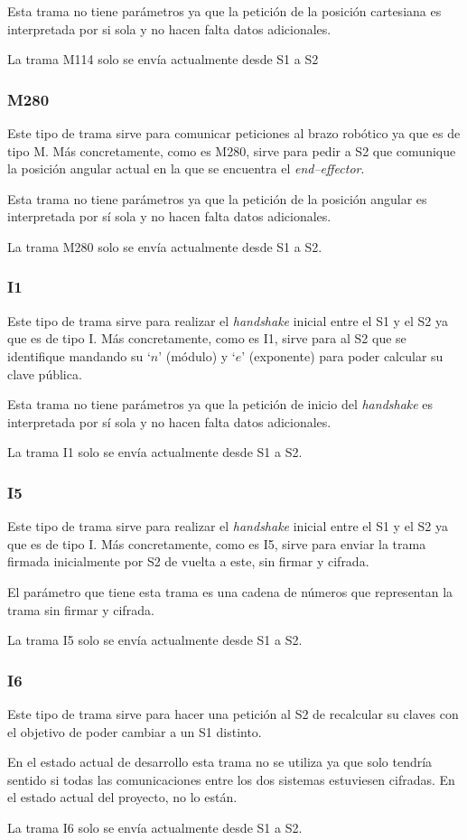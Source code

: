 Esta trama no tiene parámetros ya que la petición de la posición cartesiana es interpretada por si sola y no hacen falta datos adicionales.

La trama M114 solo se envía actualmente desde \ac{S1} a \ac{S2}

\subsubsection{M280}
Este tipo de trama sirve para comunicar peticiones al brazo robótico ya que es de tipo M. Más concretamente, como es M280, sirve para pedir a \ac{S2} que comunique la posición angular
actual en la que se encuentra el \textit{end--effector}.

Esta trama no tiene parámetros ya que la petición de la posición angular es interpretada por sí sola y no hacen falta datos adicionales.

La trama M280 solo se envía actualmente desde \ac{S1} a \ac{S2}.

\subsubsection{I1}
Este tipo de trama sirve para realizar el \textit{handshake} inicial entre el \ac{S1} y el \ac{S2} ya que es de tipo I. Más concretamente, como es I1, sirve para al \ac{S2} que se identifique mandando su `$n$' (módulo) y `$e$' (exponente) para poder calcular su clave pública.

Esta trama no tiene parámetros ya que la petición de inicio del \textit{handshake} es interpretada por sí sola y no hacen falta datos adicionales.

La trama I1 solo se envía actualmente desde \ac{S1} a \ac{S2}.

\subsubsection{I5}
Este tipo de trama sirve para realizar el \textit{handshake} inicial entre el \ac{S1} y el \ac{S2} ya que es de tipo I. Más concretamente, como es I5, sirve para enviar la trama firmada inicialmente por \ac{S2} de vuelta a este, sin firmar y cifrada. 

El parámetro que tiene esta trama es una cadena de números que representan la trama sin firmar y cifrada.

La trama I5 solo se envía actualmente desde \ac{S1} a \ac{S2}.

\subsubsection{I6}
Este tipo de trama sirve para hacer una petición al \ac{S2} de recalcular su claves con el objetivo de poder cambiar a un \ac{S1} distinto.

En el estado actual de desarrollo esta trama no se utiliza ya que solo tendría sentido si todas las comunicaciones entre los dos sistemas estuviesen cifradas. En el estado actual del proyecto, no lo están.

La trama I6 solo se envía actualmente desde \ac{S1} a \ac{S2}.




